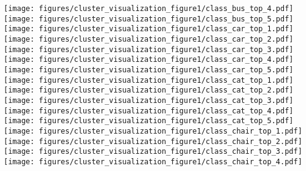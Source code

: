\documentclass{article}
\begin{document}
\begin{figure*}[htbp]
\texttt{[image: figures/cluster\_visualization\_figure1/class\_bus\_top\_4.pdf]}\hspace{-0.12cm}
\texttt{[image: figures/cluster\_visualization\_figure1/class\_bus\_top\_5.pdf]}\vspace{0.2cm}\\
\texttt{[image: figures/cluster\_visualization\_figure1/class\_car\_top\_1.pdf]}\hspace{-0.12cm}
\texttt{[image: figures/cluster\_visualization\_figure1/class\_car\_top\_2.pdf]}\hspace{-0.12cm}
\texttt{[image: figures/cluster\_visualization\_figure1/class\_car\_top\_3.pdf]}\hspace{-0.12cm}
\texttt{[image: figures/cluster\_visualization\_figure1/class\_car\_top\_4.pdf]}\hspace{-0.12cm}
\texttt{[image: figures/cluster\_visualization\_figure1/class\_car\_top\_5.pdf]}\hspace{0.2cm}
\texttt{[image: figures/cluster\_visualization\_figure1/class\_cat\_top\_1.pdf]}\hspace{-0.12cm}
\texttt{[image: figures/cluster\_visualization\_figure1/class\_cat\_top\_2.pdf]}\hspace{-0.12cm}
\texttt{[image: figures/cluster\_visualization\_figure1/class\_cat\_top\_3.pdf]}\hspace{-0.12cm}
\texttt{[image: figures/cluster\_visualization\_figure1/class\_cat\_top\_4.pdf]}\hspace{-0.12cm}
\texttt{[image: figures/cluster\_visualization\_figure1/class\_cat\_top\_5.pdf]}\vspace{0.2cm}\\
\texttt{[image: figures/cluster\_visualization\_figure1/class\_chair\_top\_1.pdf]}\hspace{-0.12cm}
\texttt{[image: figures/cluster\_visualization\_figure1/class\_chair\_top\_2.pdf]}\hspace{-0.12cm}
\texttt{[image: figures/cluster\_visualization\_figure1/class\_chair\_top\_3.pdf]}\hspace{-0.12cm}
\texttt{[image: figures/cluster\_visualization\_figure1/class\_chair\_top\_4.pdf]}\hspace{-0.12cm}

\end{figure*}
\end{document}

